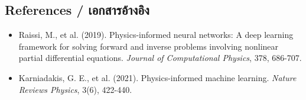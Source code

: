 \subsection{References \quad / \quad \textthai{เอกสารอ้างอิง}}
\begin{itemize}
    \item Raissi, M., et al. (2019). Physics-informed neural networks: A deep learning framework for solving forward and inverse problems involving nonlinear partial differential equations. \textit{Journal of Computational Physics}, 378, 686-707.
    \item Karniadakis, G. E., et al. (2021). Physics-informed machine learning. \textit{Nature Reviews Physics}, 3(6), 422-440.
\end{itemize}
